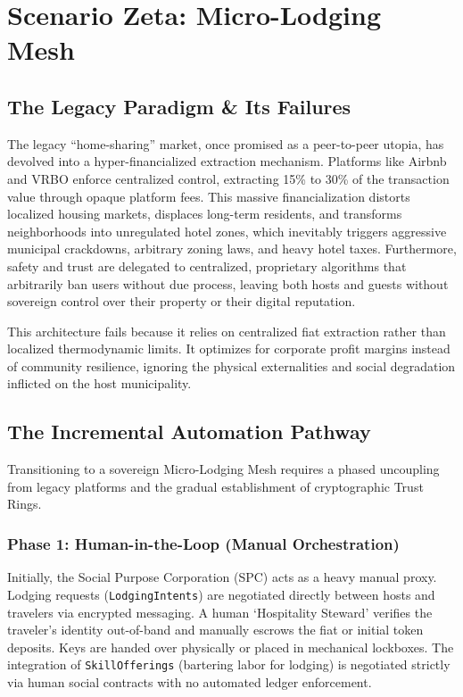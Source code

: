 \chapter{Scenario Zeta: Micro-Lodging Mesh}
\label{ch:zeta}

\section{The Legacy Paradigm \& Its Failures}
The legacy ``home-sharing'' market, once promised as a peer-to-peer utopia, has devolved into a hyper-financialized extraction mechanism. Platforms like Airbnb and VRBO enforce centralized control, extracting 15\% to 30\% of the transaction value through opaque platform fees. This massive financialization distorts localized housing markets, displaces long-term residents, and transforms neighborhoods into unregulated hotel zones, which inevitably triggers aggressive municipal crackdowns, arbitrary zoning laws, and heavy hotel taxes. Furthermore, safety and trust are delegated to centralized, proprietary algorithms that arbitrarily ban users without due process, leaving both hosts and guests without sovereign control over their property or their digital reputation.

This architecture fails because it relies on centralized fiat extraction rather than localized thermodynamic limits. It optimizes for corporate profit margins instead of community resilience, ignoring the physical externalities and social degradation inflicted on the host municipality.

\section{The Incremental Automation Pathway}
Transitioning to a sovereign Micro-Lodging Mesh requires a phased uncoupling from legacy platforms and the gradual establishment of cryptographic Trust Rings.

\subsection{Phase 1: Human-in-the-Loop (Manual Orchestration)}
Initially, the Social Purpose Corporation (SPC) acts as a heavy manual proxy. Lodging requests (\texttt{LodgingIntents}) are negotiated directly between hosts and travelers via encrypted messaging. A human `Hospitality Steward' verifies the traveler's identity out-of-band and manually escrows the fiat or initial token deposits. Keys are handed over physically or placed in mechanical lockboxes. The integration of \texttt{SkillOfferings} (bartering labor for lodging) is negotiated strictly via human social contracts with no automated ledger enforcement.


